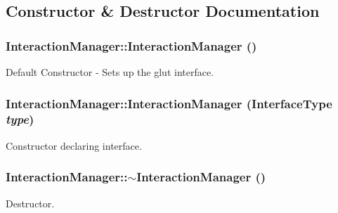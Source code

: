 \subsection{Constructor \& Destructor Documentation}
\hypertarget{class_interaction_manager_ad97c4651ffc8d746b7b99ee5cdc37d1d}{
\subsubsection[{InteractionManager}]{\setlength{\rightskip}{0pt plus 5cm}InteractionManager::InteractionManager ()}}
\label{class_interaction_manager_ad97c4651ffc8d746b7b99ee5cdc37d1d}
Default Constructor -\/ Sets up the glut interface. \hypertarget{class_interaction_manager_a2c0393088c9ac7d6f572acfe7b6c3fb9}{
\subsubsection[{InteractionManager}]{\setlength{\rightskip}{0pt plus 5cm}InteractionManager::InteractionManager ({\bf InterfaceType} {\em type})}}
\label{class_interaction_manager_a2c0393088c9ac7d6f572acfe7b6c3fb9}
Constructor declaring interface. \hypertarget{class_interaction_manager_a362e8a2f2fba538df9c33a54ec49c2ef}{
\subsubsection[{$\sim$InteractionManager}]{\setlength{\rightskip}{0pt plus 5cm}InteractionManager::$\sim$InteractionManager ()}}
\label{class_interaction_manager_a362e8a2f2fba538df9c33a54ec49c2ef}
Destructor. 

